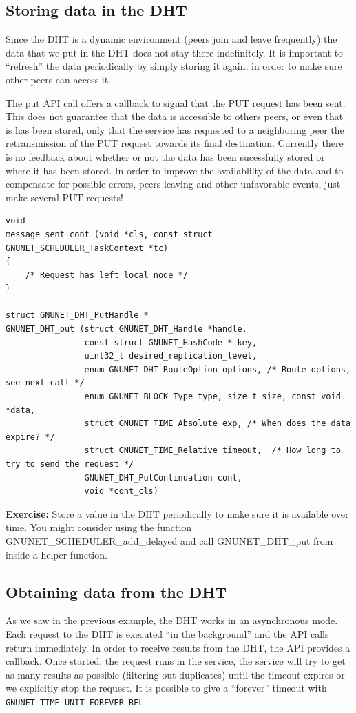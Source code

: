 \documentclass[10pt]{article}
\newcommand{\exercise}[1]{\noindent\begin{boxedminipage}{\textwidth}{\bf Exercise:} #1 \end{boxedminipage}}
\begin{document}
\subsection{Storing data in the DHT}
Since the DHT is a dynamic environment (peers join and leave frequently)
the data that we put in the DHT does not stay there indefinitely. It is
important to ``refresh'' the data periodically by simply storing it again,
in order to make sure other peers can access it.

The put API call offers a callback to signal that the PUT request has been
sent. This does not guarantee that the data is accessible to others peers,
or even that is has been stored, only that the service has requested to
a neighboring peer the retransmission of the PUT request towards its final
destination. Currently there is no feedback about whether or not the data
has been sucessfully stored or where it has been stored. In order to improve
the availablilty of the data and to compensate for possible errors, peers leaving
and other unfavorable events, just make several PUT requests!

\lstset{language=C}
\begin{lstlisting}
void
message_sent_cont (void *cls, const struct GNUNET_SCHEDULER_TaskContext *tc)
{
    /* Request has left local node */
}

struct GNUNET_DHT_PutHandle *
GNUNET_DHT_put (struct GNUNET_DHT_Handle *handle,
                const struct GNUNET_HashCode * key,
                uint32_t desired_replication_level,
                enum GNUNET_DHT_RouteOption options, /* Route options, see next call */
                enum GNUNET_BLOCK_Type type, size_t size, const void *data,
                struct GNUNET_TIME_Absolute exp, /* When does the data expire? */
                struct GNUNET_TIME_Relative timeout,  /* How long to try to send the request */
                GNUNET_DHT_PutContinuation cont,
                void *cont_cls)
\end{lstlisting}

\exercise{Store a value in the DHT periodically to make sure it is available
over time. You might consider using the function GNUNET\_SCHEDULER\_add\_delayed and
call GNUNET\_DHT\_put from inside a helper function.}


\subsection{Obtaining data from the DHT}
As we saw in the previous example, the DHT works in an asynchronous mode.
Each request to the DHT is executed ``in the background'' and the API
calls return immediately. In order to receive results from the DHT, the
API provides a callback. Once started, the request runs in the service,
the service will try to get as many results as possible (filtering out
duplicates) until the timeout expires or we explicitly stop the request.
It is possible to give a ``forever'' timeout with
{\tt GNUNET\_TIME\_UNIT\_FOREVER\_REL}.
\end{document}
